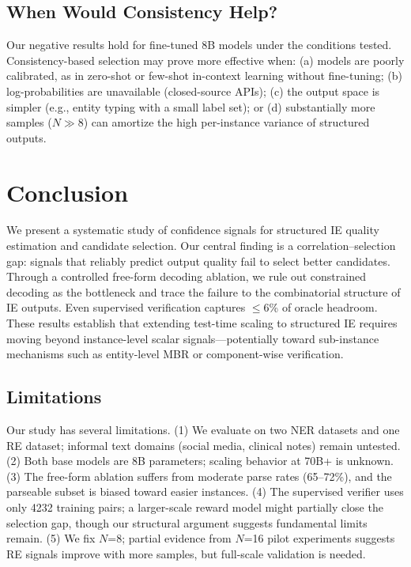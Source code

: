 \documentclass[11pt,a4paper]{article}
\begin{document}
\subsection{When Would Consistency Help?}

Our negative results hold for fine-tuned 8B models under the conditions tested. Consistency-based selection may prove more effective when: (a) models are poorly calibrated, as in zero-shot or few-shot in-context learning without fine-tuning; (b) log-probabilities are unavailable (closed-source APIs); (c) the output space is simpler (e.g., entity typing with a small label set); or (d) substantially more samples ($N \gg 8$) can amortize the high per-instance variance of structured outputs.

\section{Conclusion}

We present a systematic study of confidence signals for structured IE quality estimation and candidate selection. Our central finding is a correlation--selection gap: signals that reliably predict output quality fail to select better candidates. Through a controlled free-form decoding ablation, we rule out constrained decoding as the bottleneck and trace the failure to the combinatorial structure of IE outputs. Even supervised verification captures $\leq$6\% of oracle headroom. These results establish that extending test-time scaling to structured IE requires moving beyond instance-level scalar signals---potentially toward sub-instance mechanisms such as entity-level MBR or component-wise verification.

\subsection*{Limitations}

Our study has several limitations. (1) We evaluate on two NER datasets and one RE dataset; informal text domains (social media, clinical notes) remain untested. (2) Both base models are 8B parameters; scaling behavior at 70B+ is unknown. (3) The free-form ablation suffers from moderate parse rates (65--72\%), and the parseable subset is biased toward easier instances. (4) The supervised verifier uses only 4232 training pairs; a larger-scale reward model might partially close the selection gap, though our structural argument suggests fundamental limits remain. (5) We fix $N$=8; partial evidence from $N$=16 pilot experiments suggests RE signals improve with more samples, but full-scale validation is needed.



\end{document}
